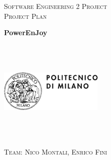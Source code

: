 \documentclass[a4paper,12pt,oneside]{book}
\begin{document}
	
	\pagestyle{empty}\centering
	\textsc{\Large Software Engineering 2 Project\\}
	\textsc{Project Plan}

	\vfill

	\textbf{\Huge PowerEnJoy}
	
	\vfill
	\begin{center}	
	\includegraphics[width=5cm,height=5cm,keepaspectratio]{polimi}
	\end{center}
	\textsc{\Large Team: Nico Montali, Enrico Fini}
	
	{\hypersetup{linkcolor=black}
		\tableofcontents
	}
	
	\clearpage
	
\end{document}

